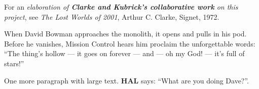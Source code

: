 \documentclass[a4paper,12pt]{article}
\begin{document}
{\large For an  \emph{elaboration of \textbf{Clarke and Kubrick's collaborative work} on this project}, see \emph{The Lost Worlds of 2001}, Arthur C. Clarke, Signet, 1972.\par}

When David Bowman approaches the monolith, it opens and pulls in his pod.
Before he vanishes, Mission Control hears him proclaim the 
un\-\mbox{forgettable} words: ``The thing's hollow --- it goes on forever --- and --- oh my God! --- it's full of stars!''

One more paragraph with {\large large text.
\textbf{HAL} says:}  ``What are you doing Dave?''. 
\end{document}
